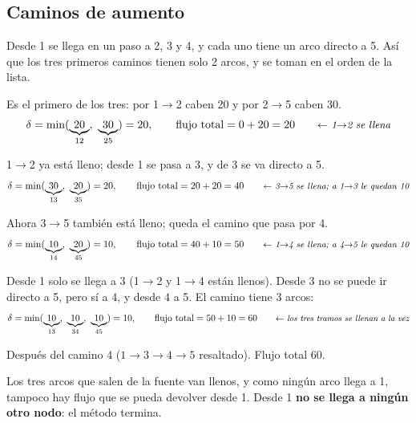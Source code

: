\documentclass[11pt,a4paper]{article}
\newcommand{\ar}[4][arco]{\draw[#1] (#2) to node[etq, lbl] {#4} (#3);}
\newcommand{\nodosTaha}{%
  \node[fuente]   (t1) at (0,-2)     {1};
  \node[nodo]     (t2) at (1.8,-0.4) {2};
  \node[nodo]     (t3) at (1.8,-2)   {3};
  \node[nodo]     (t4) at (1.8,-3.6) {4};
  \node[sumidero] (t5) at (3.6,-2)   {5};}
\begin{document}
\subsection*{Caminos de aumento}
Desde 1 se llega en un paso a 2, 3 y 4, y cada uno tiene un arco directo a 5. Así que los tres primeros caminos
tienen solo 2 arcos, y se toman en el orden de la lista.

Es el primero de los tres: por 1$\to$2 caben 20 y por 2$\to$5 caben 30.
\[
\delta = \min(\underbrace{20}_{12},\ \underbrace{30}_{25}) = 20,
\qquad \text{flujo total} = 0 + 20 = 20 \nota{1$\to$2 se llena}
\]

1$\to$2 ya está lleno; desde 1 se pasa a 3, y de 3 se va directo a 5.
\[
\delta = \min(\underbrace{30}_{13},\ \underbrace{20}_{35}) = 20,
\qquad \text{flujo total} = 20 + 20 = 40 \nota{3$\to$5 se llena; a 1$\to$3 le quedan 10}
\]

Ahora 3$\to$5 también está lleno; queda el camino que pasa por 4.
\[
\delta = \min(\underbrace{10}_{14},\ \underbrace{20}_{45}) = 10,
\qquad \text{flujo total} = 40 + 10 = 50 \nota{1$\to$4 se llena; a 4$\to$5 le quedan 10}
\]

Desde 1 solo se llega a 3 (1$\to$2 y 1$\to$4 están llenos). Desde 3 no se puede ir directo a 5, pero sí a 4,
y desde 4 a 5. El camino tiene 3 arcos:
\[
\delta = \min(\underbrace{10}_{13},\ \underbrace{10}_{34},\ \underbrace{10}_{45}) = 10,
\qquad \text{flujo total} = 50 + 10 = 60 \nota{los tres tramos se llenan a la vez}
\]

\begin{center}

\small Después del camino 4 ($1\to3\to4\to5$ resaltado). Flujo total 60.
\end{center}

Los tres arcos que salen de la fuente van llenos, y como ningún arco llega a 1, tampoco hay flujo que se pueda
devolver desde 1. Desde 1 \textbf{no se llega a ningún otro nodo}: el método termina.
\end{document}
